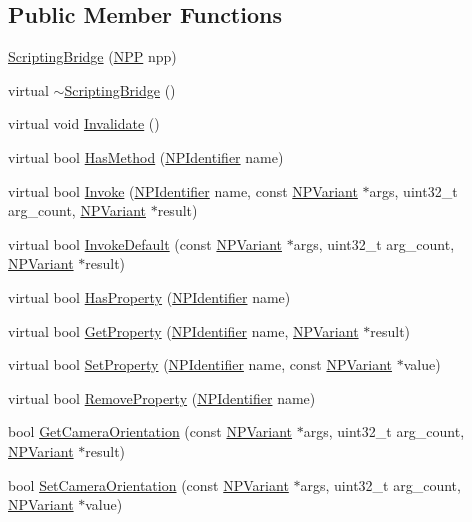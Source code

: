 \subsection*{Public Member Functions}
\begin{DoxyCompactItemize}
\item 
\hyperlink{classtumbler_1_1_scripting_bridge_aa7abb8784b22a793d795e872841b4bac}{ScriptingBridge} (\hyperlink{struct___n_p_p}{NPP} npp)
\item 
virtual \hyperlink{classtumbler_1_1_scripting_bridge_abe0d3eec9a772e0bc7f906cbc432d58d}{$\sim$ScriptingBridge} ()
\item 
virtual void \hyperlink{classtumbler_1_1_scripting_bridge_a79ca9287d682b30670932c235ce025b4}{Invalidate} ()
\item 
virtual bool \hyperlink{classtumbler_1_1_scripting_bridge_acd4789c8a9668e86ad02949ac7e88481}{HasMethod} (\hyperlink{npruntime_8h_a3ce51391e08bd3e24128c342b1d055b9}{NPIdentifier} name)
\item 
virtual bool \hyperlink{classtumbler_1_1_scripting_bridge_a70638ad7da4726fb8ccbc6f49868fafc}{Invoke} (\hyperlink{npruntime_8h_a3ce51391e08bd3e24128c342b1d055b9}{NPIdentifier} name, const \hyperlink{struct___n_p_variant}{NPVariant} $\ast$args, uint32\_\-t arg\_\-count, \hyperlink{struct___n_p_variant}{NPVariant} $\ast$result)
\item 
virtual bool \hyperlink{classtumbler_1_1_scripting_bridge_abc3713f16c739bb1c547def1afc5c93c}{InvokeDefault} (const \hyperlink{struct___n_p_variant}{NPVariant} $\ast$args, uint32\_\-t arg\_\-count, \hyperlink{struct___n_p_variant}{NPVariant} $\ast$result)
\item 
virtual bool \hyperlink{classtumbler_1_1_scripting_bridge_af5fea670d935111ef96b2ecc3adc8576}{HasProperty} (\hyperlink{npruntime_8h_a3ce51391e08bd3e24128c342b1d055b9}{NPIdentifier} name)
\item 
virtual bool \hyperlink{classtumbler_1_1_scripting_bridge_a7f8c653d8a5cb632eae37e1d59459c31}{GetProperty} (\hyperlink{npruntime_8h_a3ce51391e08bd3e24128c342b1d055b9}{NPIdentifier} name, \hyperlink{struct___n_p_variant}{NPVariant} $\ast$result)
\item 
virtual bool \hyperlink{classtumbler_1_1_scripting_bridge_a841486a4fe8e3245dd8d1711e2c72dd3}{SetProperty} (\hyperlink{npruntime_8h_a3ce51391e08bd3e24128c342b1d055b9}{NPIdentifier} name, const \hyperlink{struct___n_p_variant}{NPVariant} $\ast$value)
\item 
virtual bool \hyperlink{classtumbler_1_1_scripting_bridge_a58c45c6be183d37e0fa26de95b4410a1}{RemoveProperty} (\hyperlink{npruntime_8h_a3ce51391e08bd3e24128c342b1d055b9}{NPIdentifier} name)
\item 
bool \hyperlink{classtumbler_1_1_scripting_bridge_ace2d208ee47d10881e48945a1b9deb1e}{GetCameraOrientation} (const \hyperlink{struct___n_p_variant}{NPVariant} $\ast$args, uint32\_\-t arg\_\-count, \hyperlink{struct___n_p_variant}{NPVariant} $\ast$result)
\item 
bool \hyperlink{classtumbler_1_1_scripting_bridge_a9e3ffd7304dc607ddecad7cb8774009a}{SetCameraOrientation} (const \hyperlink{struct___n_p_variant}{NPVariant} $\ast$args, uint32\_\-t arg\_\-count, \hyperlink{struct___n_p_variant}{NPVariant} $\ast$value)
\end{DoxyCompactItemize}
